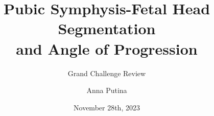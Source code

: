 
\title[ FH-PS-AoP Challenge]{Pubic Symphysis-Fetal Head Segmentation \\
and Angle of Progression}
\subtitle{Grand Challenge Review}
\author[Anna Putina]{Anna Putina}


\date[November 28th, 2023] 
{November 28th, 2023}




